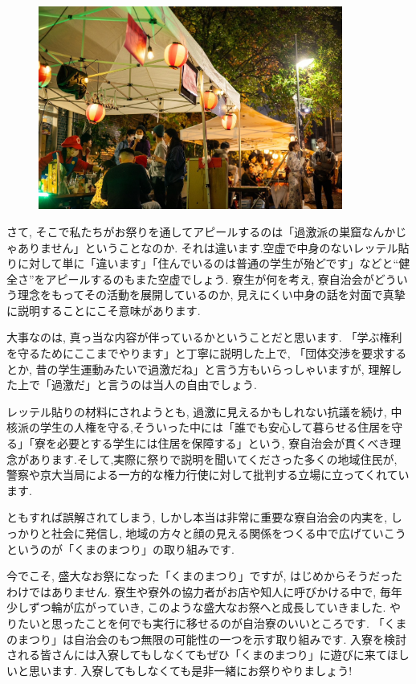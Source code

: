 \begin{figure}[H]
  \centering
  \includegraphics[width=10cm]{gazo/kumanomaturi1.jpg}
\end{figure}

さて, そこで私たちがお祭りを通してアピールするのは「過激派の巣窟なんかじゃありません」ということなのか. それは違います.空虚で中身のないレッテル貼りに対して単に「違います」「住んでいるのは普通の学生が殆どです」などと“健全さ”をアピールするのもまた空虚でしょう. 寮生が何を考え, 寮自治会がどういう理念をもってその活動を展開しているのか, 見えにくい中身の話を対面で真摯に説明することにこそ意味があります.

大事なのは, 真っ当な内容が伴っているかということだと思います. 「学ぶ権利を守るためにここまでやります」と丁寧に説明した上で, 「団体交渉を要求するとか, 昔の学生運動みたいで過激だね」と言う方もいらっしゃいますが, 理解した上で「過激だ」と言うのは当人の自由でしょう.

レッテル貼りの材料にされようとも, 過激に見えるかもしれない抗議を続け, 中核派の学生の人権を守る,そういった中には「誰でも安心して暮らせる住居を守る」「寮を必要とする学生には住居を保障する」という, 寮自治会が貫くべき理念があります.そして,実際に祭りで説明を聞いてくださった多くの地域住民が, 警察や京大当局による一方的な権力行使に対して批判する立場に立ってくれています.

ともすれば誤解されてしまう, しかし本当は非常に重要な寮自治会の内実を, しっかりと社会に発信し, 地域の方々と顔の見える関係をつくる中で広げていこうというのが「くまのまつり」の取り組みです.

今でこそ, 盛大なお祭になった「くまのまつり」ですが, はじめからそうだったわけではありません. 寮生や寮外の協力者がお店や知人に呼びかける中で, 毎年少しずつ輪が広がっていき, このような盛大なお祭へと成長していきました. やりたいと思ったことを何でも実行に移せるのが自治寮のいいところです. 「くまのまつり」は自治会のもつ無限の可能性の一つを示す取り組みです. 入寮を検討される皆さんには入寮してもしなくてもぜひ「くまのまつり」に遊びに来てほしいと思います. 入寮してもしなくても是非一緒にお祭りやりましょう!

